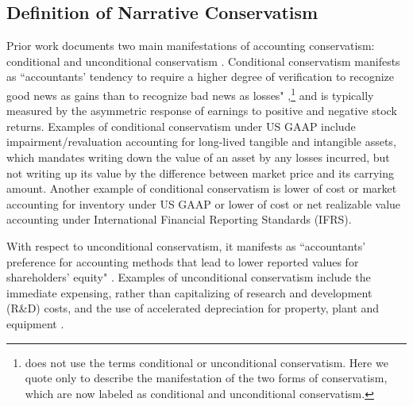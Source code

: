 \documentclass[letterpaper,12pt]{article}
\begin{document}
\begin{spacing}{1.5}
\subsection{Definition of Narrative Conservatism}\label{sec2.2}
\noindent Prior work documents two main manifestations of accounting conservatism: conditional and unconditional conservatism \cite{beaverConditionalUnconditionalConservatism2005}. Conditional conservatism manifests as ``accountants' tendency to require a higher degree of verification to recognize good news as gains than to recognize bad news as losses" \cite[p. 7]{basuConservatismPrincipleAsymmetric1997},\footnote{ does not use the terms conditional or unconditional conservatism. Here we quote  only to describe the manifestation of the two forms of conservatism, which are now labeled as conditional and unconditional conservatism.} and is typically measured by the asymmetric response of earnings to positive and negative stock returns. Examples of conditional conservatism under US GAAP include impairment/revaluation accounting for long-lived tangible and intangible assets, which mandates writing down the value of an asset by any losses incurred, but not writing up its value by the difference between market price and its carrying amount. Another example of conditional conservatism is lower of cost or market accounting for inventory under US GAAP or lower of cost or net realizable value accounting under International Financial Reporting Standards (IFRS). 

With respect to unconditional conservatism, it manifests as ``accountants' preference for accounting methods that lead to lower reported values for shareholders' equity" \cite[p. 8]{basuConservatismPrincipleAsymmetric1997}. Examples of unconditional conservatism include the immediate expensing, rather than capitalizing of research and development (R\&D) costs, and the use of accelerated depreciation for property, plant and equipment \cite{beaverConditionalUnconditionalConservatism2005}. 


\end{spacing}
\end{document}
